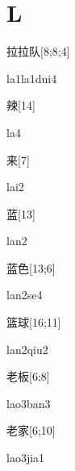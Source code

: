 ﻿%
\section*{L}

\begin{verbete}[la1la1dui4]{拉拉队}[8;8;4]
\begin{pronuncia}{la1la1dui4}
\end{pronuncia}
\end{verbete}

\begin{verbete}[la4]{辣}[14]
\begin{pronuncia}{la4}
\end{pronuncia}
\end{verbete}

\begin{verbete}[lai2]{来}[7]
\begin{pronuncia}{lai2}
\end{pronuncia}
\end{verbete}

\begin{verbete}[lan2]{蓝}[13]
\begin{pronuncia}{lan2}
\end{pronuncia}
\end{verbete}

\begin{verbete}[lan2se4]{蓝色}[13;6]
\begin{pronuncia}{lan2se4}
\end{pronuncia}
\end{verbete}

\begin{verbete}{篮球}[16;11]
\begin{pronuncia}{lan2qiu2}
\end{pronuncia}
\end{verbete}

\begin{verbete}{老板}[6;8]
\begin{pronuncia}{lao3ban3}
\end{pronuncia}
\end{verbete}

\begin{verbete}{老家}[6;10]
\begin{pronuncia}{lao3jia1}
\end{pronuncia}
\end{verbete}

